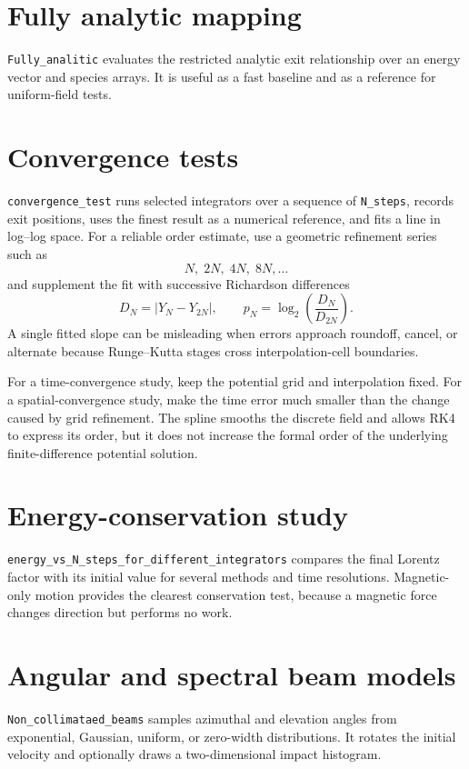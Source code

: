 \documentclass[11pt,a4paper]{report}
\newcommand{\code}[1]{\texttt{#1}}
\begin{document}
\section{Fully analytic mapping}
\code{Fully\_analitic} evaluates the restricted analytic exit relationship
over an energy vector and species arrays.  It is useful as a fast baseline and
as a reference for uniform-field tests.

\section{Convergence tests}
\code{convergence\_test} runs selected integrators over a sequence of
\code{N\_steps}, records exit positions, uses the finest result as a numerical
reference, and fits a line in log--log space.  For a reliable order estimate,
use a geometric refinement series such as
\begin{equation}
  N,\;2N,\;4N,\;8N,\ldots
\end{equation}
and supplement the fit with successive Richardson differences
\begin{equation}
  D_N=|Y_N-Y_{2N}|,\qquad
  p_N=\log_2\left(\frac{D_N}{D_{2N}}\right).
\end{equation}
A single fitted slope can be misleading when errors approach roundoff, cancel,
or alternate because Runge--Kutta stages cross interpolation-cell boundaries.

For a time-convergence study, keep the potential grid and interpolation fixed.
For a spatial-convergence study, make the time error much smaller than the
change caused by grid refinement.  The spline smooths the discrete field and
allows RK4 to express its order, but it does not increase the formal order of
the underlying finite-difference potential solution.

\section{Energy-conservation study}
\code{energy\_vs\_N\_steps\_for\_different\_integrators} compares the final
Lorentz factor with its initial value for several methods and time
resolutions.  Magnetic-only motion provides the clearest conservation test,
because a magnetic force changes direction but performs no work.

\section{Angular and spectral beam models}
\code{Non\_collimataed\_beams} samples azimuthal and elevation angles from
exponential, Gaussian, uniform, or zero-width distributions.  It rotates the
initial velocity and optionally draws a two-dimensional impact histogram.
\end{document}
